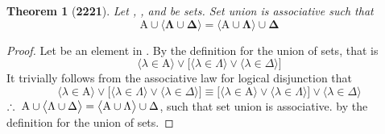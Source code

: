 \documentclass[preview]{standalone}
\newtheorem{theorem}{Theorem}
\begin{document}
\begin{theorem}[\textbf{2221}]
    Let , \bm{$\Lambda$}, and \bm{$\Delta$} be sets. 
    Set union is associative such that
    \begin{equation*}
        \bm{
            \mathrm{A} 
                \cup 
            \big \langle \Lambda \cup \Delta \big \rangle 
                = 
            \big \langle \mathrm{A} \cup \Lambda \big \rangle 
                \cup 
            \Delta
        } 
    \end{equation*}
\end{theorem}
\begin{proof}
    Let \bm{$\lambda$} be an element in 
    . 
    By the definition for the union of sets, that is
    \begin{equation*}
        \Big \langle \lambda \in \mathrm{A} \Big \rangle
            \lor
        \bigg[
            \Big \langle \lambda \in \Lambda \Big \rangle
                \lor
            \Big \langle \lambda \in \Delta \Big \rangle
        \bigg]
    \end{equation*}
    It trivially follows from the associative law for logical disjunction that
    \begin{equation*}
        \Big \langle \lambda \in \mathrm{A} \Big \rangle
            \lor
        \bigg[
            \Big \langle \lambda \in \Lambda \Big \rangle
                \lor
            \Big \langle \lambda \in \Delta \Big \rangle
        \bigg]
            \equiv
        \bigg[
            \Big \langle \lambda \in \mathrm{A} \Big \rangle
                \lor
            \Big \langle \lambda \in \Lambda \Big \rangle
        \bigg]
            \lor
        \Big \langle \lambda \in \Delta \Big \rangle
    \end{equation*}
    $\therefore \text{\space} \relax{
    \mathrm{A} 
        \cup 
    \big \langle \Lambda \cup \Delta \big \rangle 
        = 
    \big \langle \mathrm{A} \cup \Lambda \big \rangle 
        \cup 
    \Delta
    }$, 
    such that set union is associative.
    by the definition for the union of sets.
\end{proof}
\end{document}
